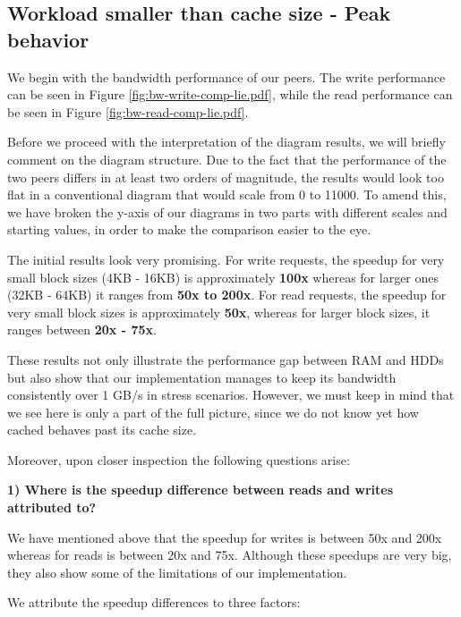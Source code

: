 \subsection{Workload smaller than cache size - Peak behavior}
\label{sec:peak-plot}

We begin with the bandwidth performance of our peers. The write performance can 
be seen in Figure \ref{fig:bw-write-comp-lie.pdf}, while the read performance 
can be seen in Figure \ref{fig:bw-read-comp-lie.pdf}.

Before we proceed with the interpretation of the diagram results, we will 
briefly comment on the diagram structure. Due to the fact that the performance 
of the two peers differs in at least two orders of magnitude, the results would 
look too flat in a conventional diagram that would scale from 0 to 11000. To 
amend this, we have broken the y-axis of our diagrams in two parts with 
different scales and starting values, in order to make the comparison easier to 
the eye.


The initial results look very promising. For write requests, the speedup for 
very small block sizes (4KB - 16KB) is approximately \textbf{100x} whereas for 
larger ones (32KB - 64KB) it ranges from \textbf{50x to 200x}. For read 
requests, the speedup for very small block sizes is approximately \textbf{50x}, 
whereas for larger block sizes, it ranges between \textbf{20x - 75x}.

These results not only illustrate the performance gap between RAM and
HDDs but also show that our implementation manages to keep its bandwidth 
consistently over 1 GB/s in stress scenarios. However, we must keep in mind 
that we see here is only a part of the full picture, since we do not know yet 
how cached behaves past its cache size.

Moreover, upon closer inspection the following questions arise:

\textbf{1) Where is the speedup difference between reads and writes attributed 
	to?}

We have mentioned above that the speedup for writes is between 50x and 200x 
whereas for reads is between 20x and 75x. Although these speedups are very big, 
they also show some of the limitations of our implementation.

We attribute the speedup differences to three factors:


